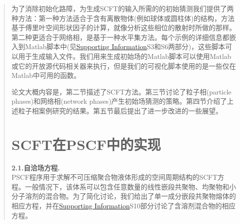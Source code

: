 \documentclass{article}
\begin{document}
\begin{CJK}{UTF8}{gkai}
\begin{quotation}
为了消除初始化路障，为生成SCFT的输入所需的的初始猜测我们提供了两种方法：第一种方法适合于含有离散物体(例如球体或圆柱体)的结构，方法基于傅里叶空间形状因子的计算，就像分析这些相位的散射时所做的那样。第二种更适合于网络相，是基于一种水平集方法。每个示例的详细信息都嵌入到Matlab脚本中(见\href{http://pubs.acs.org/doi/suppl/10.1021/acs.macromol.6b00107/suppl_file/ma6b00107_si_001.pdf}{Supporting Information}S3和S6两部分)，这些脚本可以用于生成输入文件。我们用来生成初始场的Matlab脚本可以使用Matlab或它的开放源代码相关器来执行，但是我们的可视化脚本使用的是一些仅在Matlab中可用的函数。

论文大概内容是，第二节描述了SCFT方法。第三节讨论了粒子相(particle phases)和网络相(network phases)产生初始场猜测的策略。第四节介绍了上述粒子相案例研究的结果。第五节最后提出了进一步改进的一些展望。

\section{SCFT在PSCF中的实现}
\textbf{2.1.自洽场方程.}\\
PSCF程序用于求解不可压缩聚合物液体形成的空间周期结构的SCFT方程。一般情况下，该体系可以包含任意数量的线性嵌段共聚物、均聚物和小分子溶剂的混合物。为了简化讨论，我们给出了单一成分嵌段共聚物熔体的相应方程，并在\href{http://pubs.acs.org/doi/suppl/10.1021/acs.macromol.6b00107/suppl_file/ma6b00107_si_001.pdf}{Supporting Information}S10部分讨论了含溶剂混合物的相应方程。


\end{quotation}
\end{CJK}
\end{document}
